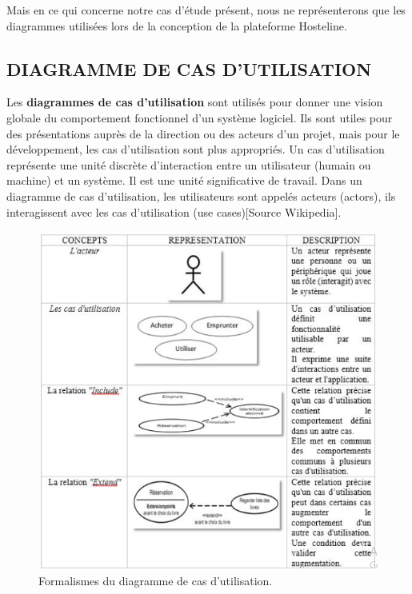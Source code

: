 Mais en ce qui concerne notre cas d’étude présent, nous ne représenterons que les diagrammes utilisées lors de la conception de la plateforme Hosteline.

\subsection{DIAGRAMME DE CAS D’UTILISATION}

Les \textbf{diagrammes de cas d'utilisation} sont utilisés pour donner une vision globale du comportement fonctionnel d'un système logiciel. Ils sont utiles pour des présentations auprès de la direction ou des acteurs d'un projet, mais pour le développement, les cas d'utilisation sont plus appropriés. Un cas d'utilisation représente une unité discrète d'interaction entre un utilisateur (humain ou machine) et un système. Il est une unité significative de travail. Dans un diagramme de cas d'utilisation, les utilisateurs sont appelés acteurs (actors), ils interagissent avec les cas d'utilisation (use cases)[Source Wikipedia].

\begin{figure}[!htbp]
	\begin{center}
		\includegraphics[scale=0.95]{images/form_use_case.png}
		\caption{Formalismes du diagramme de cas d'utilisation.}
		\label{use_case_summary}
	\end{center}
\end{figure}


